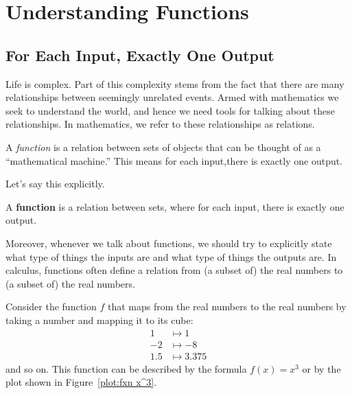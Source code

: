 \documentclass{ximera}
\begin{document}
\chapter{Understanding Functions}

\section{For Each Input, Exactly One Output}

Life is complex. Part of this complexity stems from the fact that
there are many relationships between seemingly unrelated events. Armed
with mathematics we seek to understand the world, and hence we need
tools for talking about these relationships.  In mathematics, we refer to these relationships as relations.  


A \textit{function} is a relation between sets of objects that can be
thought of as a ``mathematical machine.'' 
This means for each input,there is exactly one output. 


Let's say this explicitly.

\begin{definition}
A \textbf{function} is a relation between sets, where for each input,
there is exactly one output.
\end{definition}

Moreover, whenever we talk about functions, we should try to
explicitly state what type of things the inputs are and what type of
things the outputs are.  In calculus, functions often define a
relation from (a subset of) the real numbers to (a subset of) the real
numbers.


\begin{example}
Consider the function $f$ that maps from the real numbers to the real
numbers by taking a number and mapping it to its cube:
\begin{align*}
1 &\mapsto 1\\
-2 &\mapsto -8\\
1.5 &\mapsto 3.375
\end{align*}
and so on. This function can be described by the formula $f(x)=x^3$ or
by the plot shown in Figure~\ref{plot:fxn x^3}.
\end{example}
\end{document}
